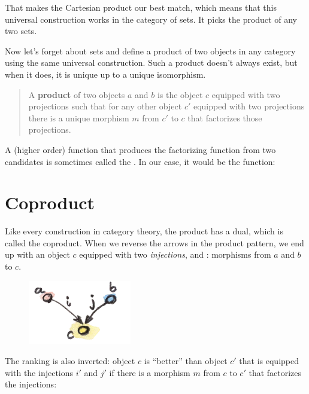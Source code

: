 That makes the Cartesian product  our best match, which
means that this universal construction works in the category of sets. It
picks the product of any two sets.

Now let's forget about sets and define a product of two objects in any
category using the same universal construction. Such a product doesn't
always exist, but when it does, it is unique up to a unique isomorphism.

\begin{quote}
A \textbf{product} of two objects $a$ and $b$ is the object
$c$ equipped with two projections such that for any other object
$c'$ equipped with two projections there is a unique morphism
$m$ from $c'$ to $c$ that factorizes those projections.
\end{quote}

\noindent
A (higher order) function that produces the factorizing function
 from two candidates is sometimes called the
. In our case, it would be the function:


\section{Coproduct}

Like every construction in category theory, the product has a dual,
which is called the coproduct. When we reverse the arrows in the product
pattern, we end up with an object $c$ equipped with two
\emph{injections},  and : morphisms from $a$
and $b$ to $c$.


\begin{figure}[H]
\centering
\includegraphics[width=0.4\textwidth]{images/coproductpattern.jpg}
\end{figure}

\noindent
The ranking is also inverted: object $c$ is ``better'' than object
$c'$ that is equipped with the injections $i'$ and $j'$
if there is a morphism $m$ from $c$ to $c'$ that
factorizes the injections:

